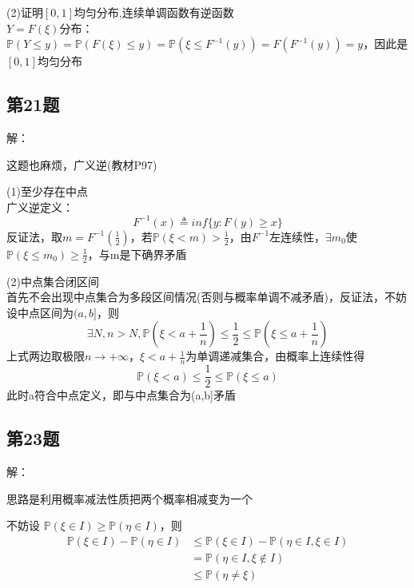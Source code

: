 \documentclass[10pt,a4paper]{article}
\begin{document}
(2)证明$[0,1]$均匀分布,连续单调函数有逆函数\\
$Y=F(\xi)$分布：$\mathbb{P}(Y \leq y)=\mathbb{P}(F(\xi) \leq y)=\mathbb{P}(\xi \leq F^{-1}(y))=F(F^{-1}(y))=y$，因此是$[0,1]$均匀分布


\subsection{第21题}
解：\\ 
\begin{shaded}
	
	这题也麻烦，广义逆(教材P97)
	
\end{shaded}

(1)至少存在中点\\
广义逆定义：
\[ F^{-1}(x) \triangleq inf \{ y \colon F(y) \geq x \} \]
反证法，取$m=F^{-1}(\frac{1}{2})$，若$ \mathbb{P}(\xi < m)>\frac{1}{2} $，由$F^{-1}$左连续性，$\exists m_{0}$使 $ \mathbb{P}(\xi \leq m_{0})\geq \frac{1}{2} $，与m是下确界矛盾


(2)中点集合闭区间\\
首先不会出现中点集合为多段区间情况(否则与概率单调不减矛盾)，反证法，不妨设中点区间为$(a,b]$，则\\
\[ \exists N, n>N, \mathbb{P}(\xi < a+\frac{1}{n})\leq \frac{1}{2}\leq \mathbb{P}(\xi \leq a+\frac{1}{n}) \]
上式两边取极限$n \to +\infty $，${\xi < a+\frac{1}{n}}$为单调递减集合，由概率上连续性得
\[ \mathbb{P}(\xi < a)\leq \frac{1}{2}\leq \mathbb{P}(\xi \leq a) \]
此时a符合中点定义，即与中点集合为(a,b]矛盾


\subsection{第23题}
解：\\ 
\begin{shaded}
	
	思路是利用概率减法性质把两个概率相减变为一个
	
\end{shaded}

不妨设 $\mathbb{P}(\xi \in I) \geq \mathbb{P}(\eta \in I) $，则
\begin{equation*}
	\begin{split}
		  \mathbb{P}(\xi \in I)-\mathbb{P}(\eta \in I)  
		 & \leq \mathbb{P}(\xi \in I)-\mathbb{P}(\eta \in I, \xi \in I) \\
		 & =\mathbb{P}(\eta \in I, \xi \notin I)  \\
		 & \leq \mathbb{P}(\eta \neq \xi )	 
	\end{split}
\end{equation*}
\end{document}
